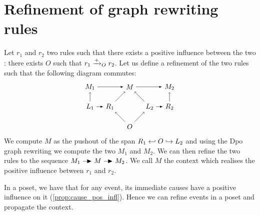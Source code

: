 \section{Refinement of graph rewriting rules}

Let $r_1$ and $r_2$ two rules such that there exists a positive influence between the two : there exists $O$ such that $r_1 \mathrel{\xrightarrow{+}}_O r_2$. Let us define a refinement of the two rules
such that the following diagram commutes:
\[
\begin{tikzpicture} %
  \node (o) at (0,-1) {\(O\)};
  \node (p) at (0,1) {\(M\)};
  \node (r1) at (-1,0) {\(R_1\)};
  \node (l1) at (-2,0) {\(L_1\)};
  \node (l2) at (1,0) {\(L_2\)};
  \node (r2) at (2,0) {\(R_2\)};
  \node (m1) at (-2,1) {\(M_1\)};
  \node (m2) at (2,1) {\(M_2\)};
  \draw [->] (l1) -- (m1);
  \draw [->] (r2) -- (m2);
  \draw [->] (o) -- (r1);
  \draw [->] (o) -- (l2);
  \draw [->] (r1) -- (p);
  \draw [->] (l2) -- (p);
  \draw [>=latex, ->] (m1) -- (p);
  \draw [>=latex, ->] (p) -- (m2);
  \draw [>=latex, ->] (l1) -- (r1);
  \draw [>=latex, ->] (l2) -- (r2);
\end{tikzpicture}
\]
We compute $M$ as the pushout of the span $R_1\hookleftarrow O\hookrightarrow L_2$ and using the Dpo graph rewriting we compute the two $M_1$ and $M_2$. We can then refine the two rules to the sequence $M_1\action M\action M_2$. We call $M$ the context which realises the positive influence between $r_1$ and $r_2$.

In a poset, we have that for any event, its immediate causes have a positive influence on it (\autoref{prop:cause_pos_infl}). Hence we can refine events in a poset and propagate the context.

